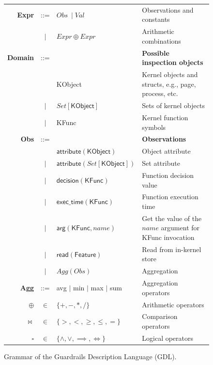 \begin{figure}[t]
\begin{tabular}{rclp{3.4cm}}
\textbf{Expr}
& ::= & $Obs\ \mid Val$
& Observations and constants \\
& $\mid$ & $Expr \oplus Expr$
& Arithmetic combinations \\[4pt]

\textbf{Domain} 
& ::= & & \textbf{Possible inspection objects} \\
& & \textsf{KObject}
& Kernel objects and structs, e.g., page, process, etc. \\
& $\mid$ & $Set[\textsf{KObject}]$
& Sets of kernel objects \\
& $\mid$ & \textsf{KFunc}
& Kernel function symbols \\[4pt]

\textbf{Obs} 
& ::= & & \textbf{Observations} \\
& & $\textsf{attribute}(\textsf{KObject})$ 
& Object attribute \\
& $\mid$ & $\textsf{attribute}(Set[\textsf{KObject}])$ 
& Set attribute \\
& $\mid$ & $\textsf{decision}(\textsf{KFunc})$ 
& Function decision value \\
& $\mid$ & $\textsf{exec\_time}(\textsf{KFunc})$ 
& Function execution time \\
& $\mid$ & $\textsf{arg}(\textsf{KFunc}, name)$ 
& Get the value of the $name$ argument for \textsf{KFunc} invocation \\
& $\mid$ & $\textsf{read}(\textsf{Feature})$ 
& Read from in-kernel store \\
& $\mid$ & $Agg(Obs)$ 
& Aggregation \\[4pt]

\textbf{Agg} 
& ::= & \textsf{avg} $\mid$ \textsf{min} $\mid$ \textsf{max} $\mid$ \textsf{sum} 
& Aggregation operators \\[4pt]

$\oplus$ & $\in$ & $\{+,-,*,/\}$
& Arithmetic operators \\[4pt]

$\bowtie$ & $\in$ & $\{>,<,\geq,\leq,=\}$
& Comparison operators \\[4pt]

$\square$ & $\in$ & $\{\wedge,\vee,\implies,\iff\}$
& Logical operators
\end{tabular}
\caption{Grammar of the Guardrails Description Language (GDL). }
\label{fig:gdl-grammar}
\end{figure}